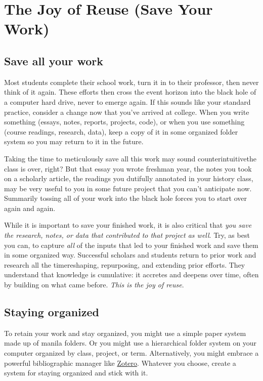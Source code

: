 
\hypertarget{joyofreuse}{}

\chapter{The Joy of Reuse (Save Your Work)}


\section{Save all your work}

Most students complete their school work, turn it in to their professor, then never think of it again. These efforts then cross the event horizon into the black hole of a computer hard drive, never to emerge again. If this sounds like your standard practice, consider a change now that you've arrived at college. When you write something (essays, notes, reports, projects, code), or when you use something (course readings, research, data), keep a copy of it in some organized folder system so you may return to it in the future. 

Taking the time to meticulously save all this work may sound counterintuitive\textemdash the class is over, right? But that essay you wrote freshman year, the notes you took on a scholarly article, the readings you dutifully annotated in your history class, may be very useful to you in some future project that you can't anticipate now. Summarily tossing all of your work into the black hole forces you to start over again and again. 

While it is important to save your finished work, it is also critical that \emph{you save the research, notes, or data that contributed to that project as well}. Try, as best you can, to capture \emph{all} of the inputs that led to your finished work and save them in some organized way. Successful scholars and students return to prior work and research all the time\textemdash reshaping, repurposing, and extending prior efforts. They understand that knowledge is cumulative: it accretes and deepens over time, often by building on what came before. \emph{This is the joy of reuse}. 

\section{Staying organized}

To retain your work and stay organized, you might use a simple paper system made up of manila folders. Or you might use a hierarchical folder system on your computer organized by class, project, or term. Alternatively, you might embrace a powerful bibliographic manager like \href{www.zotero.org}{Zotero}. Whatever you choose, create a system for staying organized and stick with it. 

